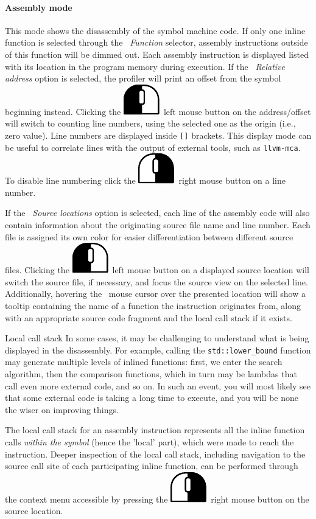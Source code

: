 \documentclass[hidelinks,titlepage,a4paper]{article}
\newcommand{\LMB}{\includegraphics[height=.8\baselineskip]{icons/lmb}}
\newcommand{\RMB}{\includegraphics[height=.8\baselineskip]{icons/rmb}}
\begin{document}
\paragraph{Assembly mode}

This mode shows the disassembly of the symbol machine code. If only one inline function is selected through the \emph{\faSitemap{}~Function} selector, assembly instructions outside of this function will be dimmed out. Each assembly instruction is displayed listed with its location in the program memory during execution. If the \emph{\faSearchLocation{}~Relative address} option is selected, the profiler will print an offset from the symbol beginning instead. Clicking the \LMB{}~left mouse button on the address/offset will switch to counting line numbers, using the selected one as the origin (i.e., zero value). Line numbers are displayed inside \texttt{[]} brackets. This display mode can be useful to correlate lines with the output of external tools, such as \texttt{llvm-mca}. To disable line numbering click the \RMB{}~right mouse button on a line number.

If the \emph{\faFileImport{}~Source locations} option is selected, each line of the assembly code will also contain information about the originating source file name and line number. Each file is assigned its own color for easier differentiation between different source files. Clicking the \LMB{}~left mouse button on a displayed source location will switch the source file, if necessary, and focus the source view on the selected line. Additionally, hovering the \faMousePointer{}~mouse cursor over the presented location will show a tooltip containing the name of a function the instruction originates from, along with an appropriate source code fragment and the local call stack if it exists.

\begin{bclogo}[
noborder=true,
couleur=black!5,
logo=\bclampe
]{Local call stack}
In some cases, it may be challenging to understand what is being displayed in the disassembly. For example, calling the \texttt{std::lower\_bound} function may generate multiple levels of inlined functions: first, we enter the search algorithm, then the comparison functions, which in turn may be lambdas that call even more external code, and so on. In such an event, you will most likely see that some external code is taking a long time to execute, and you will be none the wiser on improving things.

The local call stack for an assembly instruction represents all the inline function calls \emph{within the symbol} (hence the 'local' part), which were made to reach the instruction. Deeper inspection of the local call stack, including navigation to the source call site of each participating inline function, can be performed through the context menu accessible by pressing the \RMB{}~right mouse button on the source location.
\end{bclogo}
\end{document}
